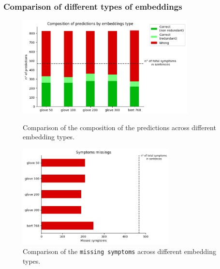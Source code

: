 \subsubsection{Comparison of different types of embeddings}

\begin{figure}[h]%
  \centering
  \begin{minipage}[b]{0.4\textwidth}
    \includegraphics[width=9cm]{graphs/comparison_embeddings_type}
    \caption{Comparison of the composition of the predictions across different embedding types.}
  \end{minipage}
  \hfill
  \begin{minipage}[b]{0.4\textwidth}
    \includegraphics[width=8cm]{graphs/comparison_embeddings_type_missings}
    \caption{Comparison of the \texttt{missing symptoms} across different embedding types.}
  \end{minipage}
\end{figure}

